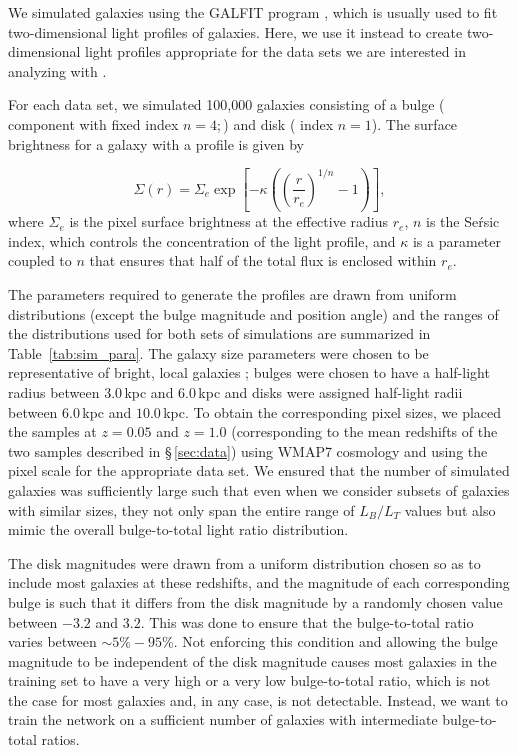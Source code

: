 We simulated galaxies using the GALFIT program \citep{galfit}, which is usually used to fit two-dimensional light profiles of galaxies. Here, we use it instead to create two-dimensional light profiles appropriate for the data sets we are interested in analyzing with \gamornet{}.

For each data set, we simulated 100,000 galaxies consisting of a bulge (\sersic{} component with fixed index $n=4$;\,\citet{de_vac_48}) and disk (\sersic{} index $n=1$). The surface brightness for a galaxy with a \sersic{} profile is given by

\begin{equation}
\label{eq:sersic_fn}
\Sigma(r) = \Sigma_e \exp \left[ -\kappa \left( \left( \frac{r}{r_e}\right)^{1/n} - 1 \right) \right] ,
\end{equation}
where $\Sigma_e$ is the pixel surface brightness at the effective radius $r_e$, $n$ is the Se\'rsic index, which controls the concentration of the light profile, and $\kappa$ is a parameter coupled to $n$ that ensures that half of the total flux is enclosed within $r_e$.


The parameters required to generate the \sersic{} profiles are drawn from uniform distributions (except the bulge magnitude and position angle) and the ranges of the distributions used for both sets of simulations are summarized in Table~\ref{tab:sim_para}. The galaxy size parameters were chosen to be representative of bright, local galaxies \citep{binney_and_merrifield}; bulges were chosen to have a half-light radius between $3.0$\,kpc and $6.0$\,kpc and disks were assigned half-light radii between $6.0$\,kpc and $10.0$\,kpc. To obtain the corresponding pixel sizes, we placed the samples at $ z = 0.05$ and $z = 1.0$ (corresponding to the mean redshifts of the two samples described in \S\,\ref{sec:data}) using WMAP7 cosmology \citep{wmap7} and using the pixel scale for the appropriate data set. We ensured that the number of simulated galaxies was sufficiently large such that even when we consider subsets of galaxies with similar sizes, they not only span the entire range of $L_B/L_T$ values but also mimic the overall bulge-to-total light ratio distribution.  

The disk magnitudes were drawn from a uniform distribution chosen so as to include most galaxies at these redshifts, and the magnitude of each corresponding bulge is such that it differs from the disk magnitude by a randomly chosen value between $-3.2$ and $3.2$. This was done to ensure that the bulge-to-total ratio varies between $\sim 5\% - 95\%$. Not enforcing this condition and allowing the bulge magnitude to be independent of the disk magnitude causes most galaxies in the training set to have a very high or a very low bulge-to-total ratio, which is not the case for most galaxies and, in any case, is not detectable. Instead, we want to train the network on a sufficient number of galaxies with intermediate bulge-to-total ratios.  

